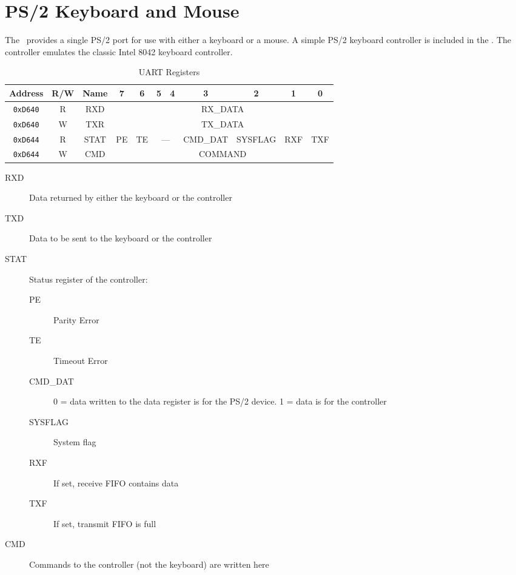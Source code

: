 \chapter{PS/2 Keyboard and Mouse}

The \jr\ provides a single PS/2 port for use with either a keyboard or a mouse. A simple PS/2 keyboard controller is included in the \jr. The controller emulates the classic Intel 8042 keyboard controller.

\begin{table}[h]
    \begin{center}
        \begin{tabular}{|c|c|c|c|c|c|c|c|c|c|c|} \hline
            Address & R/W & Name & 7 & 6 & 5 & 4 & 3 & 2 & 1 & 0 \\\hline\hline
            \verb+0xD640+ & R & RXD & \multicolumn{8}{|c|}{RX\_DATA} \\ \hline
            \verb+0xD640+ & W & TXR & \multicolumn{8}{|c|}{TX\_DATA} \\ \hline
            \verb+0xD644+ & R & STAT & PE & TE & \multicolumn{2}{|c|}{---} & CMD\_DAT & SYSFLAG & RXF & TXF \\ \hline
            \verb+0xD644+ & W & CMD & \multicolumn{8}{|c|}{COMMAND} \\ \hline
        \end{tabular}
    \end{center}
    \caption{UART Registers}
    \label{tab:ps2_reg}
\end{table}

\begin{description}
    \item[RXD] Data returned by either the keyboard or the controller

    \item[TXD] Data to be sent to the keyboard or the controller

    \item[STAT] Status register of the controller:
    \begin{description}
        \item[PE] Parity Error
        \item[TE] Timeout Error
        \item[CMD\_DAT] 0 = data written to the data register is for the PS/2 device. 1 = data is for the controller
        \item[SYSFLAG] System flag
        \item[RXF] If set, receive FIFO contains data
        \item[TXF] If set, transmit FIFO is full
    \end{description}

    \item[CMD] Commands to the controller (not the keyboard) are written here
\end{description}
